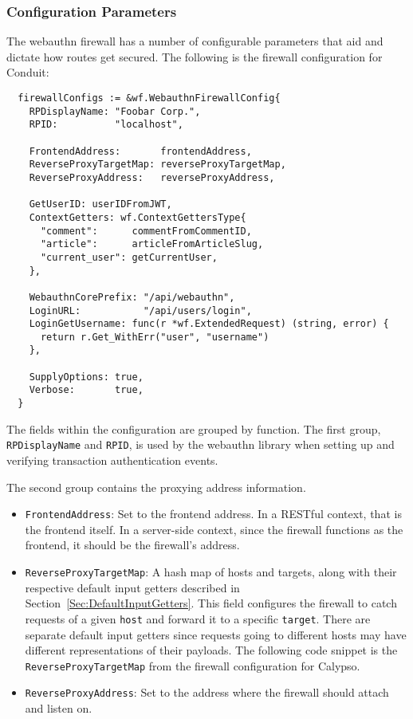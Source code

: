 \subsubsection{Configuration Parameters}\label{Sec:ConfigurationParameters}

The webauthn firewall has a number of configurable parameters that aid and dictate how routes get secured. The following is the firewall configuration for Conduit:

\begin{lstlisting}
  firewallConfigs := &wf.WebauthnFirewallConfig{
    RPDisplayName: "Foobar Corp.",
    RPID:          "localhost",

    FrontendAddress:       frontendAddress,
    ReverseProxyTargetMap: reverseProxyTargetMap,
    ReverseProxyAddress:   reverseProxyAddress,

    GetUserID: userIDFromJWT,
    ContextGetters: wf.ContextGettersType{
      "comment":      commentFromCommentID,
      "article":      articleFromArticleSlug,
      "current_user": getCurrentUser,
    },

    WebauthnCorePrefix: "/api/webauthn",
    LoginURL:           "/api/users/login",
    LoginGetUsername: func(r *wf.ExtendedRequest) (string, error) {
      return r.Get_WithErr("user", "username")
    },

    SupplyOptions: true,
    Verbose:       true,
  }
\end{lstlisting}

The fields within the configuration are grouped by function. The first group, \lstinline{RPDisplayName} and \lstinline{RPID}, is used by the webauthn library when setting up and verifying transaction authentication events. 

\noindent The second group contains the proxying address information. 

\begin{itemize}[nosep]
\item \lstinline{FrontendAddress}: Set to the frontend address. In a RESTful context, that is the frontend itself. In a server-side context, since the firewall functions as the frontend, it should be the firewall's address.

\item \lstinline{ReverseProxyTargetMap}: A hash map of hosts and targets, along with their respective default input getters described in Section~\ref{Sec:DefaultInputGetters}. This field configures the firewall to catch requests of a given \lstinline{host} and forward it to a specific \lstinline{target}. There are separate default input getters since requests going to different hosts may have different representations of their payloads. The following code snippet is the \lstinline{ReverseProxyTargetMap} from the firewall configuration for Calypso.

\item \lstinline{ReverseProxyAddress}: Set to the address where the firewall should attach and listen on.
\end{itemize}

